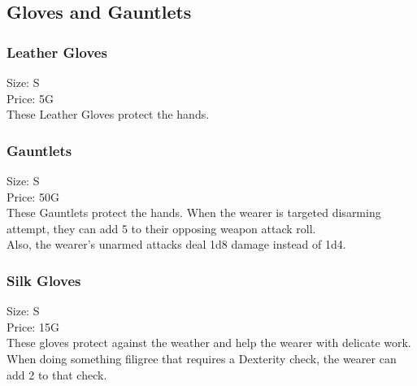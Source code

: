 \subsection{Gloves and Gauntlets}

\subsubsection{Leather Gloves}
Size: S\\
Price: 5G\\
These Leather Gloves protect the hands.

\subsubsection{Gauntlets}
Size: S\\
Price: 50G\\
These Gauntlets protect the hands.
When the wearer is targeted disarming attempt, they can add 5 to their opposing weapon attack roll.\\
Also, the wearer's unarmed attacks deal 1d8 damage instead of 1d4.

\subsubsection{Silk Gloves}
Size: S\\
Price: 15G\\
These gloves protect against the weather and help the wearer with delicate work.
When doing something filigree that requires a Dexterity check, the wearer can add 2 to that check.